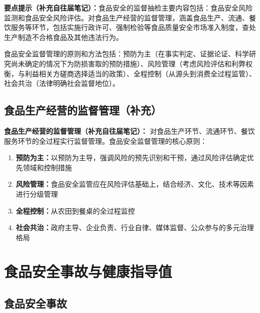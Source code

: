 \begin{tipbox}
\textbf{要点提示（补充自往届笔记）：}食品安全的监督抽检主要内容包括：食品安全风险监测和食品安全风险评估。对食品生产经营的监督管理，涵盖食品生产、流通、餐饮服务等环节，包括实施行政许可、强制检验等食品质量安全市场准入制度，查处生产制造不合格食品及其他违法行为。

食品安全监督管理的原则和方法包括：预防为主（在事实判定、证据论证、科学研究尚未确定的情况下为防损害取的预防措施）、风险管理（考虑风险评估和利弊权衡，与利益相关方磋商选择适当的政策）、全程控制（从源头到消费全过程监管）、社会共治（法律明确社会监督地位）。
\end{tipbox}

\subsection{食品生产经营的监督管理（补充）}

\begin{defbox}
\textbf{食品生产经营的监督管理（补充自往届笔记）：}
对食品生产环节、流通环节、餐饮服务环节的全过程实行监督管理。食品安全监督管理的核心原则：
\begin{enumerate}[leftmargin=*]
    \item \textbf{预防为主：}以预防为主导，强调风险的预先识别和干预，通过风险评估确定优先领域和控制措施
    \item \textbf{风险管理：}食品安全监管应在风险评估基础上，结合经济、文化、技术等因素进行分级管理
    \item \textbf{全程控制：}从农田到餐桌的全过程监控
    \item \textbf{社会共治：}政府主导、企业负责、行业自律、媒体监督、公众参与的多元治理格局
\end{enumerate}
\end{defbox}

\section{食品安全事故与健康指导值}

\subsection{食品安全事故}

